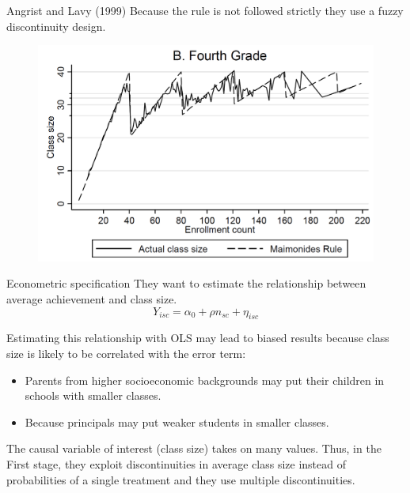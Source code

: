 \documentclass[handout]{beamer}
\begin{document}
\begin{frame}{Angrist and Lavy (1999)}
Because the rule is not followed strictly they use a fuzzy discontinuity design.
\begin{figure}
	\centering
	\includegraphics[width=0.8\linewidth]{./Figures/angristlavy}
\end{figure}

\end{frame}	

\begin{frame}{Econometric specification}
They want to estimate the relationship between average achievement and class size.\bigskip
\[Y_{isc}= \alpha_0 + \rho n_{sc} + \eta_{isc} \]

Estimating this relationship with OLS may lead to biased results because class size is likely to be correlated with the error term:
\begin{itemize}
	\item Parents from higher socioeconomic backgrounds may put their children in schools with smaller classes.
	\item  Because principals may put weaker students in smaller classes.
\end{itemize}

The causal variable of interest (class size) takes on many values. Thus, in the First stage, they exploit discontinuities in average class size instead of probabilities of a single treatment and they use multiple discontinuities.
\end{frame}
\end{document}
